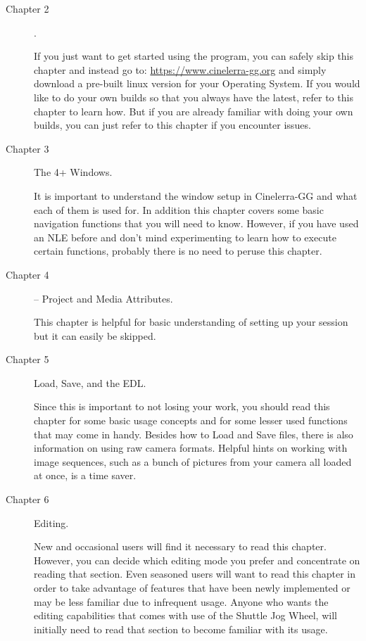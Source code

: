 \begin{description}
    \item[Chapter 2 ] .

        If you just want to get started using the program, you can safely skip this chapter and instead go to:
        \url{https://www.cinelerra-gg.org}
        and simply download a pre-built linux version for your Operating System. If you would like to do your own builds so that you always have the latest, refer to this chapter to learn how. 
        But if you are already familiar with doing your own builds, you can just refer to this chapter if you encounter issues.
    \item[Chapter 3 ] The 4+ Windows.

        It is important to understand the window setup in Cinelerra-GG and what each of them is used for. 
        In addition this chapter covers some basic navigation functions that you will need to know. 
        However, if you have used an NLE before and don’t mind experimenting to learn how to execute certain functions, probably there is no need to peruse this chapter.
    \item[Chapter 4 ] – Project and Media Attributes.

        This chapter is helpful for basic understanding of setting up your session but it can easily be skipped.

    \item[Chapter 5] Load, Save, and the EDL.

        Since this is important to not losing your work, you should read this chapter for some basic usage concepts and for some lesser used functions that may come in handy. 
        Besides how to Load and Save files, there is also information on using raw camera formats. 
        Helpful hints on working with image sequences, such as a bunch of pictures from your camera all loaded at once, is a time saver.

    \item[Chapter 6] Editing.

        New and occasional users will find it necessary to read this chapter. However, you can decide which editing mode you prefer and concentrate on reading that section. 
        Even seasoned users will want to read this chapter in order to take advantage of features that have been newly implemented or may be less familiar due to infrequent usage. 
        Anyone who wants the editing capabilities that comes with use of the Shuttle Jog Wheel, will initially need to read that section to become familiar with its usage.


\end{description}
